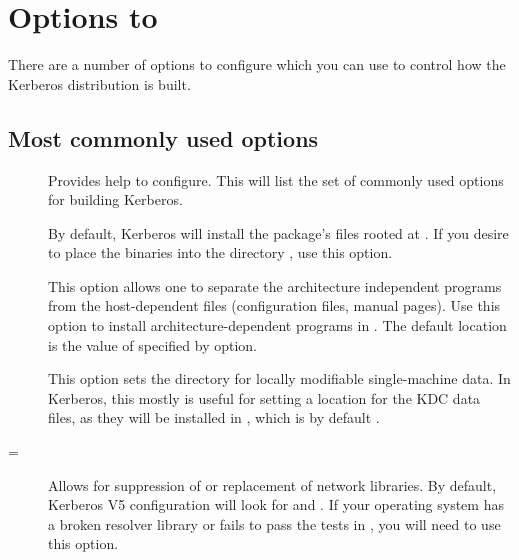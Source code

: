 \documentclass[letterpaper,10pt,english]{sphinxmanual}
\begin{document}
\section{Options to }
\label{\detokenize{build/options2configure:options2configure}}\label{\detokenize{build/options2configure::doc}}\label{\detokenize{build/options2configure:options-to-configure}}
There are a number of options to configure which you can use to
control how the Kerberos distribution is built.


\subsection{Most commonly used options}
\label{\detokenize{build/options2configure:most-commonly-used-options}}\begin{description}
\item[{\sphinxstylestrong{-}}] \leavevmode
Provides help to configure.  This will list the set of commonly
used options for building Kerberos.

\item[{\sphinxstylestrong{-}}] \leavevmode
By default, Kerberos will install the package’s files rooted at
.  If you desire to place the binaries into the
directory , use this option.

\item[{\sphinxstylestrong{-}}] \leavevmode
This option allows one to separate the architecture independent
programs from the host-dependent files (configuration files,
manual pages).  Use this option to install architecture-dependent
programs in .  The default location is the value of
specified by \sphinxstylestrong{-} option.

\item[{\sphinxstylestrong{-}}] \leavevmode
This option sets the directory for locally modifiable
single-machine data.  In Kerberos, this mostly is useful for
setting a location for the KDC data files, as they will be
installed in , which is by default
.

\item[{\sphinxstylestrong{-}\sphinxstylestrong{-with-netlib}{[}=\sphinxstyleemphasis{libs}{]}}] \leavevmode
Allows for suppression of or replacement of network libraries.  By
default, Kerberos V5 configuration will look for  and
.  If your operating system has a broken resolver
library or fails to pass the tests in , you
will need to use this option.


\end{description}
\end{document}
